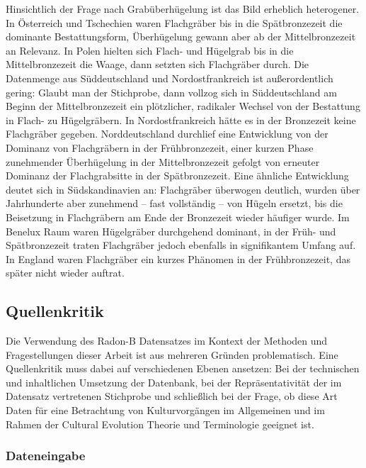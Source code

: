 \documentclass[openany,twoside,twocolumn]{book}
\begin{document}
Hinsichtlich der Frage nach Grabüberhügelung ist das Bild erheblich heterogener. In Österreich und Tschechien waren Flachgräber bis in die Spätbronzezeit die dominante Bestattungsform, Überhügelung gewann aber ab der Mittelbronzezeit an Relevanz. In Polen hielten sich Flach- und Hügelgrab bis in die Mittelbronzezeit die Waage, dann setzten sich Flachgräber durch. Die Datenmenge aus Süddeutschland und Nordostfrankreich ist außerordentlich gering: Glaubt man der Stichprobe, dann vollzog sich in Süddeutschland am Beginn der Mittelbronzezeit ein plötzlicher, radikaler Wechsel von der Bestattung in Flach- zu Hügelgräbern. In Nordostfrankreich hätte es in der Bronzezeit keine Flachgräber gegeben. Norddeutschland durchlief eine Entwicklung von der Dominanz von Flachgräbern in der Frühbronzezeit, einer kurzen Phase zunehmender Überhügelung in der Mittelbronzezeit gefolgt von erneuter Dominanz der Flachgrabsitte in der Spätbronzezeit. Eine ähnliche Entwicklung deutet sich in Südskandinavien an: Flachgräber überwogen deutlich, wurden über Jahrhunderte aber zunehmend -- fast vollständig -- von Hügeln ersetzt, bis die Beisetzung in Flachgräbern am Ende der Bronzezeit wieder häufiger wurde. Im Benelux Raum waren Hügelgräber durchgehend dominant, in der Früh- und Spätbronzezeit traten Flachgräber jedoch ebenfalls in signifikantem Umfang auf. In England waren Flachgräber ein kurzes Phänomen in der Frühbronzezeit, das später nicht wieder auftrat.

\hypertarget{source-criticism}{%
\subsection{Quellenkritik}\label{source-criticism}}

Die Verwendung des Radon-B Datensatzes im Kontext der Methoden und Fragestellungen dieser Arbeit ist aus mehreren Gründen problematisch. Eine Quellenkritik muss dabei auf verschiedenen Ebenen ansetzen: Bei der technischen und inhaltlichen Umsetzung der Datenbank, bei der Repräsentativität der im Datensatz vertretenen Stichprobe und schließlich bei der Frage, ob diese Art Daten für eine Betrachtung von Kulturvorgängen im Allgemeinen und im Rahmen der Cultural Evolution Theorie und Terminologie geeignet ist.

\hypertarget{dateneingabe}{%
\subsubsection{Dateneingabe}\label{dateneingabe}}
\end{document}

